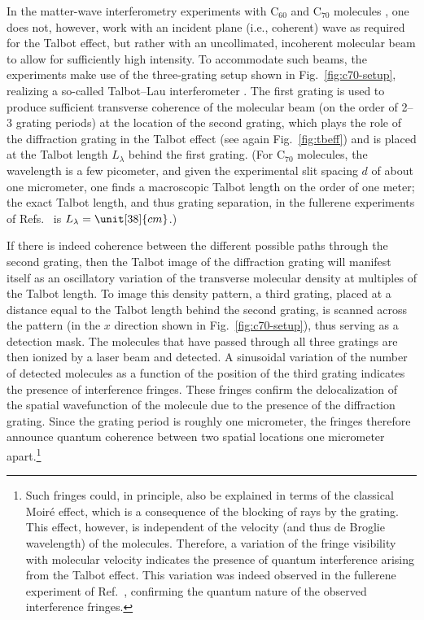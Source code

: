 \documentclass[3p,sort&compress,12pt]{elsarticle}
\begin{document}
In the matter-wave interferometry experiments with C$_{60}$ and C$_{70}$  molecules \cite{Brezger:2002:mu,Hornberger:2003:tv,Hackermueller:2002:wb,Hackermuller:2003:uu,Hackermuller:2004:rd}, one does not, however, work with an incident plane (i.e., coherent) wave as required for the Talbot effect, but rather with an uncollimated, incoherent molecular beam to allow for sufficiently high intensity. To accommodate such beams, the experiments make use of the three-grating setup shown in Fig.~\ref{fig:c70-setup}, realizing a so-called  Talbot--Lau interferometer \cite{Brezger:2002:mu,Hornberger:2003:tv,Hackermuller:2003:uu,Hackermueller:2002:wb,Hackermuller:2004:rd}. The first grating is used to produce sufficient transverse coherence of the molecular beam (on the order of 2--3 grating periods) at the location of the second grating, which plays the role of the diffraction grating in the Talbot effect (see again Fig.~\ref{fig:tbeff}) and is placed at the Talbot length $L_\lambda$ behind the first grating. (For C$_{70}$ molecules, the wavelength is a few picometer, and given the experimental slit spacing $d$ of about one micrometer, one finds a macroscopic Talbot length on the order of one meter; the exact Talbot length, and thus grating separation, in the fullerene experiments of Refs.~\cite{Brezger:2002:mu,Hornberger:2003:tv,Hackermueller:2002:wb,Hackermuller:2003:uu,Hackermuller:2004:rd} is $L_\lambda = \unit[38]{cm}$.) 

If there is indeed coherence between the different possible paths through the second grating, then the Talbot image of the diffraction grating will manifest itself as an oscillatory variation of the transverse molecular density at multiples of the Talbot length. To image this density pattern, a third grating, placed at a distance equal to the Talbot length behind the second grating, is scanned across the pattern (in the $x$ direction shown in Fig.~\ref{fig:c70-setup}), thus serving as a detection mask. The molecules that have passed through all three gratings are then ionized by a laser beam and detected. A sinusoidal variation of the number of detected molecules as a function of the position of the third grating indicates the presence of interference fringes. These fringes confirm the delocalization of the spatial wavefunction of the molecule due to the presence of the diffraction grating. Since the grating period is roughly one micrometer, the fringes therefore announce quantum coherence between two spatial locations one micrometer apart.\footnote{Such fringes could, in principle, also be explained in terms of the classical Moir\'e effect, which is a consequence of the blocking of rays by the grating. This effect, however, is independent of the velocity (and thus de Broglie wavelength) of the molecules. Therefore, a variation of the fringe visibility with molecular velocity indicates the presence of quantum interference arising from the Talbot effect. This variation was indeed observed in the fullerene experiment of Ref.~\cite{Brezger:2002:mu}, confirming the quantum nature of the observed interference fringes.}  
\end{document}
